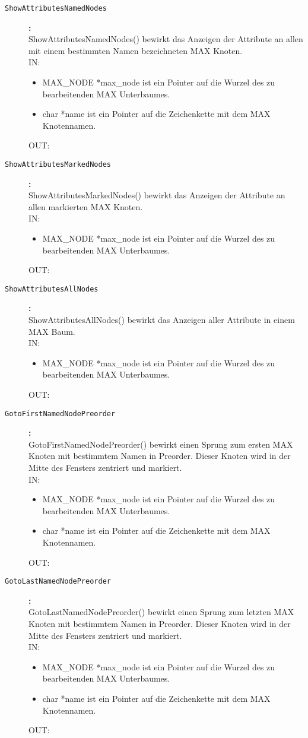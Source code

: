 \begin{description}
\item[\tt ShowAttributesNamedNodes]{\bf :\\}
ShowAttributesNamedNodes() bewirkt das Anzeigen der Attribute an allen mit einem bestimmten Namen bezeichneten MAX Knoten. \\
IN:
\begin{itemize}
   \item MAX\_NODE *max\_node ist ein Pointer auf die Wurzel des zu bearbeitenden MAX Unterbaumes.
   \item char *name ist ein Pointer auf die Zeichenkette mit dem MAX Knotennamen.
\end{itemize}
OUT:

\item[\tt ShowAttributesMarkedNodes]{\bf :\\}
ShowAttributesMarkedNodes() bewirkt das Anzeigen der Attribute an allen markierten MAX Knoten. \\
IN:
\begin{itemize}
   \item MAX\_NODE *max\_node ist ein Pointer auf die Wurzel des zu bearbeitenden MAX Unterbaumes.
\end{itemize}
OUT:

\item[\tt ShowAttributesAllNodes]{\bf :\\}
ShowAttributesAllNodes() bewirkt das Anzeigen aller Attribute in einem MAX Baum. \\
IN:
\begin{itemize}
   \item MAX\_NODE *max\_node ist ein Pointer auf die Wurzel des zu bearbeitenden MAX Unterbaumes.
\end{itemize}
OUT:

\item[\tt GotoFirstNamedNodePreorder]{\bf :\\}
GotoFirstNamedNodePreorder() bewirkt einen Sprung zum ersten MAX Knoten mit bestimmtem Namen in Preorder. Dieser Knoten wird in der Mitte des Fensters zentriert und markiert. \\
IN:
\begin{itemize}
   \item MAX\_NODE *max\_node ist ein Pointer auf die Wurzel des zu bearbeitenden MAX Unterbaumes.
   \item char *name ist ein Pointer auf die Zeichenkette mit dem MAX Knotennamen.
\end{itemize}
OUT:

\item[\tt GotoLastNamedNodePreorder]{\bf :\\}
GotoLastNamedNodePreorder() bewirkt einen Sprung zum letzten MAX Knoten mit bestimmtem Namen in Preorder. Dieser Knoten wird in der Mitte des Fensters zentriert und markiert. \\
IN:
\begin{itemize}
   \item MAX\_NODE *max\_node ist ein Pointer auf die Wurzel des zu bearbeitenden MAX Unterbaumes.
   \item char *name ist ein Pointer auf die Zeichenkette mit dem MAX Knotennamen.
\end{itemize}
OUT:


\end{description}
